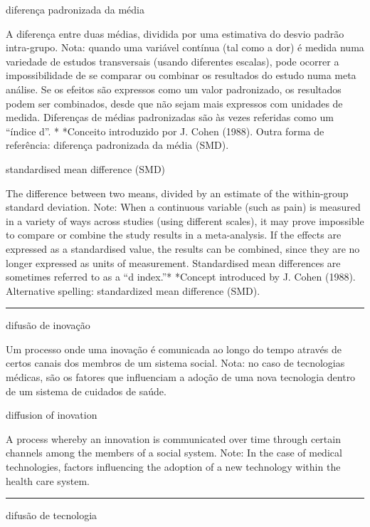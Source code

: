 \documentclass[
]{book}
\begin{document}
diferença padronizada da média

A diferença entre duas médias, dividida por uma estimativa do desvio padrão intra-grupo. Nota: quando uma variável contínua (tal como a dor) é medida numa variedade de estudos transversais (usando diferentes escalas), pode ocorrer a impossibilidade de se comparar ou combinar os resultados do estudo numa meta análise. Se os efeitos são expressos como um valor padronizado, os resultados podem ser combinados, desde que não sejam mais expressos com unidades de medida. Diferenças de médias padronizadas são às vezes referidas como um ``índice d''. * *Conceito introduzido por J. Cohen (1988). Outra forma de referência: diferença padronizada da média (SMD).

standardised mean difference (SMD)

The difference between two means, divided by an estimate of the within-group standard deviation. Note: When a continuous variable (such as pain) is measured in a variety of ways across studies (using different scales), it may prove impossible to compare or combine the study results in a meta-analysis. If the effects are expressed as a standardised value, the results can be combined, since they are no longer expressed as units of measurement. Standardised mean differences are sometimes referred to as a ``d index.''* *Concept introduced by J. Cohen (1988). Alternative spelling: standardized mean difference (SMD).

\begin{center}\rule{0.5\linewidth}{0.5pt}\end{center}

difusão de inovação

Um processo onde uma inovação é comunicada ao longo do tempo através de certos canais dos membros de um sistema social. Nota: no caso de tecnologias médicas, são os fatores que influenciam a adoção de uma nova tecnologia dentro de um sistema de cuidados de saúde.

diffusion of inovation

A process whereby an innovation is communicated over time through certain channels among the members of a social system. Note: In the case of medical technologies, factors influencing the adoption of a new technology within the health care system.

\begin{center}\rule{0.5\linewidth}{0.5pt}\end{center}

difusão de tecnologia
\end{document}
